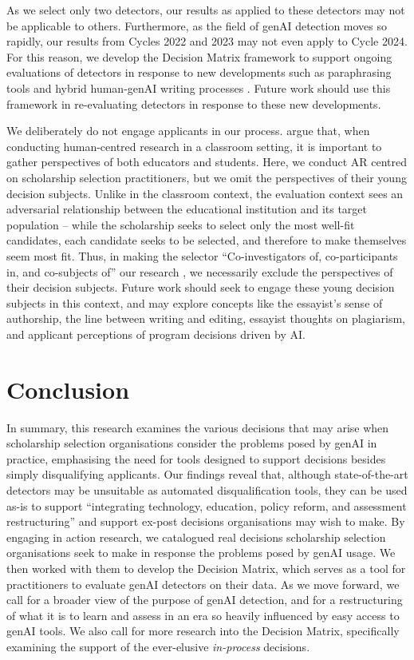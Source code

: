 As we select only two detectors, our results as applied to these detectors may not be applicable to others. Furthermore, as the field of genAI detection moves so rapidly, our results from Cycles 2022 and 2023 may not even apply to Cycle 2024. For this reason, we develop the Decision Matrix framework to support ongoing evaluations of detectors in response to new developments such as paraphrasing tools and hybrid human-genAI writing processes \cite{kalpesh_krishna_paraphrasing_2023}. Future work should use this framework in re-evaluating detectors in response to these new developments.

We deliberately do not engage applicants in our process. \textcite{venn-wycherley_realities_2024} argue that, when conducting human-centred research in a classroom setting, it is important to gather perspectives of both educators and students. Here, we conduct AR centred on scholarship selection practitioners, but we omit the perspectives of their young decision subjects. Unlike in the classroom context, the evaluation context sees an adversarial relationship between the educational institution and its target population – while the scholarship seeks to select only the most well-fit candidates, each candidate seeks to be selected, and therefore to make themselves seem most fit. Thus, in making the selector ``Co-investigators of, co-participants in, and co-subjects of'' our research \cite{Hayes_2011}, we necessarily exclude the perspectives of their decision subjects. Future work should seek to engage these young decision subjects in this context, and may explore concepts like the essayist's sense of authorship, the line between writing and editing, essayist thoughts on plagiarism, and applicant perceptions of program decisions driven by AI.

\section{Conclusion}
In summary, this research examines the various decisions that may arise when scholarship selection organisations consider the problems posed by genAI in practice, emphasising the need for tools designed to support decisions besides simply disqualifying applicants. Our findings reveal that, although state-of-the-art detectors may be unsuitable as automated disqualification tools, they can be used as-is to support ``integrating technology, education, policy reform, and assessment restructuring'' \cite{MikePerkins_JasperRoe_2023} and support ex-post decisions organisations may wish to make. By engaging in action research, we catalogued real decisions scholarship selection organisations seek to make in response the problems posed by genAI usage. We then worked with them to develop the Decision Matrix, which serves as a tool for practitioners to evaluate genAI detectors on their data. As we move forward, we call for a broader view of the purpose of genAI detection, and for a restructuring of what it is to learn and assess in an era so heavily influenced by easy access to genAI tools. We also call for more research into the Decision Matrix, specifically examining the support of the ever-elusive \emph{in-process} decisions.